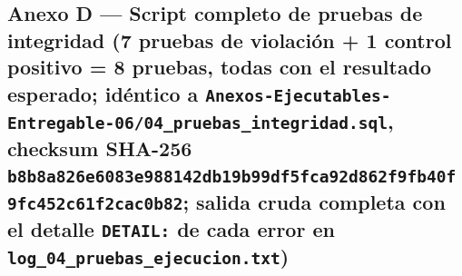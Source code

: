\documentclass[11pt,a4paper]{article}
\begin{document}
\subsection{\texorpdfstring{Anexo D --- Script completo de pruebas de integridad (7 pruebas de violación + 1 control positivo = 8 pruebas, todas con el resultado esperado; idéntico a \texttt{Anexos-Ejecutables-Entregable-06/04\_pruebas\_integridad.sql}, checksum SHA-256 \texttt{b8b8a826e6083e988142db19b99df5fca92d862f9fb40f9fc452c61f2cac0b82}; salida cruda completa con el detalle \texttt{DETAIL:} de cada error en \texttt{log\_04\_pruebas\_ejecucion.txt})}{Anexo D --- Script completo de pruebas de integridad (7 pruebas de violación + 1 control positivo = 8 pruebas, todas con el resultado esperado; idéntico a Anexos-Ejecutables-Entregable-06/04\_pruebas\_integridad.sql, checksum SHA-256 b8b8a826e6083e988142db19b99df5fca92d862f9fb40f9fc452c61f2cac0b82; salida cruda completa con el detalle DETAIL: de cada error en log\_04\_pruebas\_ejecucion.txt)}}\label{anexo-d-script-completo-de-pruebas-de-integridad-7-pruebas-de-violaciuxf3n-1-control-positivo-8-pruebas-todas-con-el-resultado-esperado-iduxe9ntico-a-anexos-ejecutables-entregable-0604_pruebas_integridad.sql-checksum-sha-256-b8b8a826e6083e988142db19b99df5fca92d862f9fb40f9fc452c61f2cac0b82-salida-cruda-completa-con-el-detalle-detail-de-cada-error-en-log_04_pruebas_ejecucion.txt}
\end{document}
